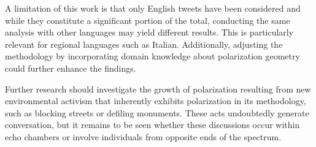 A limitation of this work is that only English tweets have been considered and while they constitute a significant portion of the total, conducting the same analysis with other languages may yield different results. This is particularly relevant for regional languages such as Italian. Additionally, adjusting the methodology by incorporating domain knowledge about polarization geometry\cite{radicioni_networked_2021} could further enhance the findings.

Further research should investigate the growth of polarization resulting from new environmental activism that inherently exhibits polarization in its methodology, such as blocking streets or defiling monuments. These acts undoubtedly generate conversation, but it remains to be seen whether these discussions occur within echo chambers or involve individuals from opposite ends of the spectrum.



